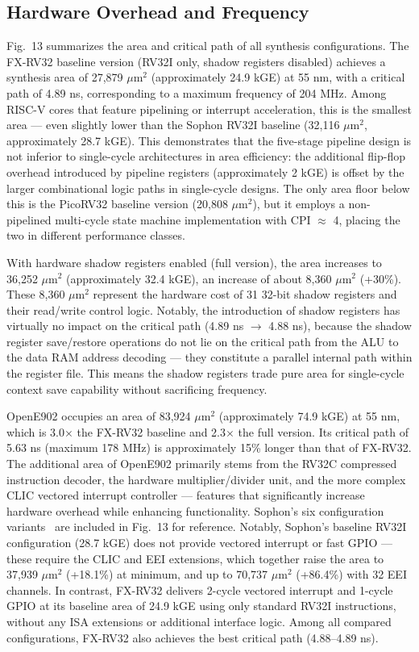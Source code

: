 \documentclass[letterpaper,journal]{IEEEtran}
\begin{document}
\subsection{Hardware Overhead and Frequency}
Fig.~13 summarizes the area and critical path of all synthesis configurations.
The FX-RV32 baseline version (RV32I only, shadow registers disabled) achieves a synthesis area of 27,879 $\mu$m$^2$ (approximately 24.9 kGE) at 55 nm, with a critical path of 4.89 ns, corresponding to a maximum frequency of 204 MHz.
Among RISC-V cores that feature pipelining or interrupt acceleration, this is the smallest area — even slightly lower than the Sophon RV32I baseline (32,116 $\mu$m$^2$, approximately 28.7 kGE).
This demonstrates that the five-stage pipeline design is not inferior to single-cycle architectures in area efficiency: the additional flip-flop overhead introduced by pipeline registers (approximately 2 kGE) is offset by the larger combinational logic paths in single-cycle designs.
The only area floor below this is the PicoRV32 baseline version (20,808 $\mu$m$^2$), but it employs a non-pipelined multi-cycle state machine implementation with CPI $\approx$ 4, placing the two in different performance classes.

With hardware shadow registers enabled (full version), the area increases to 36,252 $\mu$m$^2$ (approximately 32.4 kGE), an increase of about 8,360 $\mu$m$^2$ (+30\%).
These 8,360 $\mu$m$^2$ represent the hardware cost of 31 32-bit shadow registers and their read/write control logic.
Notably, the introduction of shadow registers has virtually no impact on the critical path (4.89 ns $\rightarrow$ 4.88 ns), because the shadow register save/restore operations do not lie on the critical path from the ALU to the data RAM address decoding — they constitute a parallel internal path within the register file.
This means the shadow registers trade pure area for single-cycle context save capability without sacrificing frequency.

OpenE902 occupies an area of 83,924 $\mu$m$^2$ (approximately 74.9 kGE) at 55 nm, which is 3.0$\times$ the FX-RV32 baseline and 2.3$\times$ the full version.
Its critical path of 5.63 ns (maximum 178 MHz) is approximately 15\% longer than that of FX-RV32.
The additional area of OpenE902 primarily stems from the RV32C compressed instruction decoder, the hardware multiplier/divider unit, and the more complex CLIC vectored interrupt controller — features that significantly increase hardware overhead while enhancing functionality.
Sophon's six configuration variants~\cite{ref1} are included in Fig.~13 for reference.
Notably, Sophon's baseline RV32I configuration (28.7 kGE) does not provide vectored interrupt or fast GPIO — these require the CLIC and EEI extensions, which together raise the area to 37,939 $\mu$m$^2$ (+18.1\%) at minimum, and up to 70,737 $\mu$m$^2$ (+86.4\%) with 32 EEI channels.
In contrast, FX-RV32 delivers 2-cycle vectored interrupt and 1-cycle GPIO at its baseline area of 24.9 kGE using only standard RV32I instructions, without any ISA extensions or additional interface logic.
Among all compared configurations, FX-RV32 also achieves the best critical path (4.88--4.89 ns).
\end{document}

